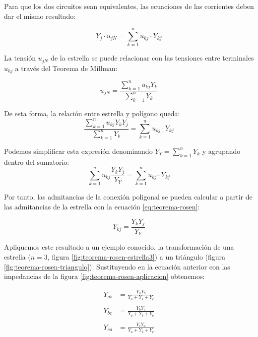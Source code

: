 Para que los dos circuitos sean equivalentes, las ecuaciones de las corrientes deben dar el mismo resultado:

\begin{equation}
  Y_j \cdot u_{jN} = \sum_{k = 1}^n u_{kj} \cdot Y_{kj}  
\end{equation}

La tensión $u_{jN}$ de la estrella se puede relacionar con las tensiones entre terminales $u_{kj}$ a través del Teorema de Millman:

\begin{equation}
  u_{jN} = \frac{\sum_{k = 1}^n u_{kj} Y_k}{\sum_{k  = 1}^n Y_k}
\end{equation}

De esta forma, la relación entre estrella y polígono queda:
\begin{equation}
  \frac{\sum_{k = 1}^n u_{kj} Y_k Y_j}{\sum_{k  = 1}^n Y_k} = \sum_{k = 1}^n u_{kj} \cdot Y_{kj}  
\end{equation}

Podemos simplificar esta expresión denominando $Y_Y = \sum_{k  = 1}^n Y_k$ y agrupando dentro del sumatorio:
\begin{equation}
  \sum_{k = 1}^n u_{kj} \frac{Y_k Y_j}{Y_Y} = \sum_{k = 1}^n u_{kj} \cdot Y_{kj}  
\end{equation}

Por tanto, las admitancias de la conexión poligonal se pueden calcular a partir de las admitancias de la estrella con la ecuación \ref{eq:teorema-rosen}:

\begin{equation}
  Y_{kj} = \frac{Y_k Y_j}{Y_Y}
  \label{eq:teorema-rosen}
\end{equation}

Apliquemos este resultado a un ejemplo conocido, la transformación de una estrella ($n = 3$, figura \ref{fig:teorema-rosen-estrella3}) a un triángulo (figura \ref{fig:teorema-rosen-triangulo}). Sustituyendo en la ecuación anterior con las impedancias de la figura \ref{fig:teorema-rosen-aplicacion} obtenemos:

\begin{align*}
  Y_{ab} &= \frac{Y_a Y_b}{Y_a + Y_b + Y_c}\\
  \\
  Y_{bc} &= \frac{Y_b Y_c}{Y_a + Y_b + Y_c}\\
  \\
  Y_{ca} &= \frac{Y_c Y_a}{Y_a + Y_b + Y_c}\\
\end{align*}

